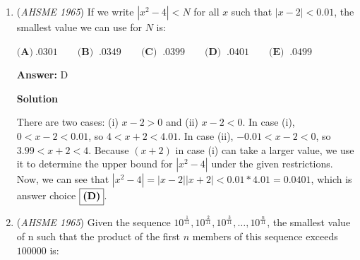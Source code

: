 \begin{enumerate}
 $\textbf{(A)}\ \text{for all values of }x, a_0\neq 0 \qquad \textbf{(B) }\ \text{for all values of }x \\ \textbf{(C) }\ \text{only when }x = 0 \qquad \textbf{(D) }\ \text{only when }x = r \text{ or }x = s \\ \textbf{(E) }\ \text{only when }x = r \text{ or }x = s, a_0 \neq 0$

 \textbf{Answer: }A



\textbf{Solution}

$a_0$ cannot be $0$, because $a_2 \neq 0$, so the polynomial can take non-zero values when $a_0=0$ and thereby not satisfy the equation. Expanding $a_0(1-\frac{x}{r})(1-\frac{x}{s})$ gives us $a_0(1-\frac{x}{r}-\frac{x}{s}+\frac{x^2}{rs})$. Using \href{https://artofproblemsolving.com/wiki/index.php?title=Vieta\%27s\_formulas}{Vieta's formulas}, we see that $rs=\frac{a_0}{a_2}$, so $a_0=a_2rs$. Plugging this into the expanded right hand side of the given equation, we see that that side equals $a_0-a_2(r+s)x+a_2x^2$. Using Vieta's formulas again, we equate this expression to $a_0+a_1x+a_2x^2$, which is the left hand side of the given equation. Thus, as long as $a_0 \neq 0$, the equation holds for all values of $x$. This fact corresponds with answer choice $\fbox{\textbf{(A)}}$.

 


	\item (\textit{AHSME 1965}) If we write $|x^2 - 4| < N$ for all $x$ such that $|x - 2| < 0.01$, the smallest value we can use for $N$ is: 


 $\textbf{(A)}\ .0301 \qquad  \textbf{(B) }\ .0349 \qquad  \textbf{(C) }\ .0399 \qquad  \textbf{(D) }\ .0401 \qquad  \textbf{(E) }\ .0499\qquad$

 \textbf{Answer: }D



\textbf{Solution}

There are two cases: (i) $x-2>0$ and (ii) $x-2<0$. In case (i), $0<x-2<0.01$, so $4<x+2<4.01$. In case (ii), $-0.01<x-2<0$, so $3.99<x+2<4$. Because $(x+2)$ in case (i) can take a larger value, we use it to determine the upper bound for $|x^2-4|$ under the given restrictions. Now, we can see that $|x^2-4|=|x-2||x+2|<0.01*4.01=\boxed{0.0401}$, which is answer choice $\fbox{\textbf{(D)}}$.

 


	\item (\textit{AHSME 1965}) Given the sequence $10^{\frac {1}{11}},10^{\frac {2}{11}},10^{\frac {3}{11}},\ldots,10^{\frac {n}{11}}$, 
the smallest value of n such that the product of the first $n$ members of this sequence exceeds $100000$ is: 



\end{enumerate}
